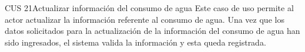 
\begin{UseCase}{CUS 21}{Actualizar información del consumo de agua}
    {
	  Este caso de uso permite al actor actualizar la información referente al consumo de agua. Una vez que los datos solicitados para la actualización de la información del consumo de agua han sido ingresados, el sistema valida la información y esta queda registrada.
    }
    


\end{UseCase}
